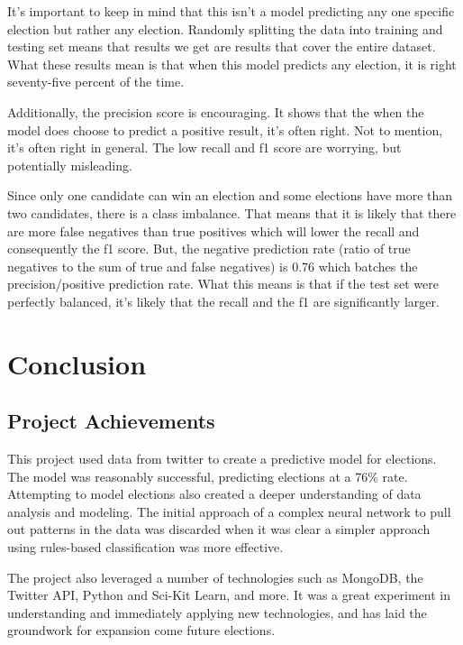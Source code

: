 \documentclass[11pt, twoside, reqno]{book}
\begin{document}
It's important to keep in mind that this isn't a model predicting any one specific election but rather any election. Randomly splitting the data into training and testing set means that results we get are results that cover the entire dataset. What these results mean is that when this model predicts any election, it is right seventy-five percent of the time. 

Additionally, the precision score is encouraging. It shows that the when the model does choose to predict a positive result, it's often right. Not to mention, it's often right in general. The low recall and f1 score are worrying, but potentially misleading. 

Since only one candidate can win an election and some elections have more than two candidates, there is a class imbalance. That means that it is likely that there are more false negatives than true positives which will lower the recall and consequently the f1 score. But, the negative prediction rate (ratio of true negatives to the sum of true and false negatives) is 0.76 which batches the precision/positive prediction rate. What this means is that if the test set were perfectly balanced, it's likely that the recall and the f1 are significantly larger. 


\chapter{Conclusion}
\section{Project Achievements}
\hspace{0.2in}This project used data from twitter to create a predictive model for elections. The model was reasonably successful, predicting elections at a 76\% rate. Attempting to model elections also created a deeper understanding of data analysis and modeling. The initial approach of a complex neural network to pull out patterns in the data was discarded when it was clear a simpler approach using rules-based classification was more effective. 

The project also leveraged a number of technologies such as MongoDB, the Twitter API, Python and Sci-Kit Learn, and more. It was a great experiment in understanding and immediately applying new technologies, and has laid the groundwork for expansion come future elections. 
\end{document}
